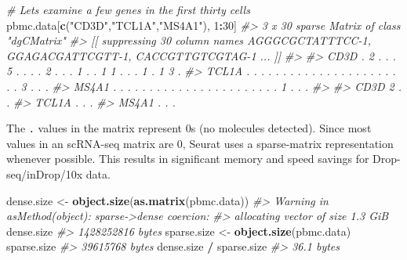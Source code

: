 \documentclass[
]{book}
\newenvironment{Shaded}{\begin{snugshade}}{\end{snugshade}}
\newcommand{\CommentTok}[1]{\textcolor[rgb]{0.56,0.35,0.01}{\textit{#1}}}
\newcommand{\DecValTok}[1]{\textcolor[rgb]{0.00,0.00,0.81}{#1}}
\newcommand{\FunctionTok}[1]{\textcolor[rgb]{0.13,0.29,0.53}{\textbf{#1}}}
\newcommand{\NormalTok}[1]{#1}
\newcommand{\OtherTok}[1]{\textcolor[rgb]{0.56,0.35,0.01}{#1}}
\newcommand{\SpecialCharTok}[1]{\textcolor[rgb]{0.81,0.36,0.00}{\textbf{#1}}}
\newcommand{\StringTok}[1]{\textcolor[rgb]{0.31,0.60,0.02}{#1}}
\begin{document}
\begin{Shaded}
\begin{Highlighting}[]
\CommentTok{\# Lets examine a few genes in the first thirty cells}
\NormalTok{pbmc.data[}\FunctionTok{c}\NormalTok{(}\StringTok{"CD3D"}\NormalTok{,}\StringTok{"TCL1A"}\NormalTok{,}\StringTok{"MS4A1"}\NormalTok{), }\DecValTok{1}\SpecialCharTok{:}\DecValTok{30}\NormalTok{]}
\CommentTok{\#\textgreater{} 3 x 30 sparse Matrix of class "dgCMatrix"}
\CommentTok{\#\textgreater{}   [[ suppressing 30 column names \textquotesingle{}AGGGCGCTATTTCC{-}1\textquotesingle{}, \textquotesingle{}GGAGACGATTCGTT{-}1\textquotesingle{}, \textquotesingle{}CACCGTTGTCGTAG{-}1\textquotesingle{} ... ]]}
\CommentTok{\#\textgreater{}                                                            }
\CommentTok{\#\textgreater{} CD3D  . 2 . . . 5 . . . . 2 . . . 1 . . 1 1 . . . 1 . 1 3 .}
\CommentTok{\#\textgreater{} TCL1A . . . . . . . . . . . . . . . . . . . . . . . 3 . . .}
\CommentTok{\#\textgreater{} MS4A1 . . . . . . . . . . . . . . . . . . . . . . . 1 . . .}
\CommentTok{\#\textgreater{}            }
\CommentTok{\#\textgreater{} CD3D  2 . .}
\CommentTok{\#\textgreater{} TCL1A . . .}
\CommentTok{\#\textgreater{} MS4A1 . . .}
\end{Highlighting}
\end{Shaded}

The \texttt{.} values in the matrix represent 0s (no molecules detected). Since most values in an scRNA-seq matrix are 0, Seurat uses a sparse-matrix representation whenever possible. This results in significant memory and speed savings for Drop-seq/inDrop/10x data.

\begin{Shaded}
\begin{Highlighting}[]
\NormalTok{dense.size }\OtherTok{\textless{}{-}} \FunctionTok{object.size}\NormalTok{(}\FunctionTok{as.matrix}\NormalTok{(pbmc.data))}
\CommentTok{\#\textgreater{} Warning in asMethod(object): sparse{-}\textgreater{}dense coercion:}
\CommentTok{\#\textgreater{} allocating vector of size 1.3 GiB}
\NormalTok{dense.size}
\CommentTok{\#\textgreater{} 1428252816 bytes}
\NormalTok{sparse.size }\OtherTok{\textless{}{-}} \FunctionTok{object.size}\NormalTok{(pbmc.data)}
\NormalTok{sparse.size}
\CommentTok{\#\textgreater{} 39615768 bytes}
\NormalTok{dense.size }\SpecialCharTok{/}\NormalTok{ sparse.size}
\CommentTok{\#\textgreater{} 36.1 bytes}
\end{Highlighting}
\end{Shaded}
\end{document}
